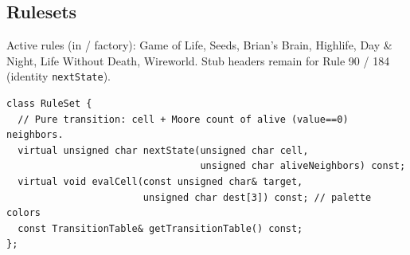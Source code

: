 \subsection{Rulesets}
Active rules (in  / factory): Game of Life, Seeds, Brian's
Brain, Highlife, Day \& Night, Life Without Death, Wireworld. Stub headers
remain for Rule 90 / 184 (identity \texttt{nextState}).

\begin{lstlisting}
class RuleSet {
  // Pure transition: cell + Moore count of alive (value==0) neighbors.
  virtual unsigned char nextState(unsigned char cell,
                                  unsigned char aliveNeighbors) const;
  virtual void evalCell(const unsigned char& target,
                        unsigned char dest[3]) const; // palette colors
  const TransitionTable& getTransitionTable() const;
};
\end{lstlisting}

